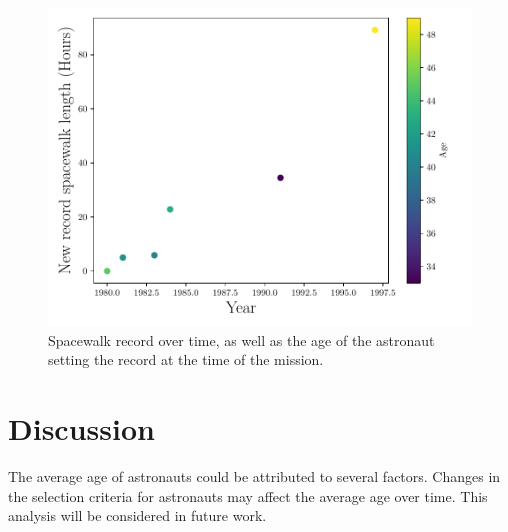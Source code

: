 \documentclass{article}
\begin{document}
\begin{figure}[h]
\centering
\includegraphics[width=\textwidth]{../analysis/spacewalk_record.pdf}
\caption{Spacewalk record over time, as well as the age of the astronaut setting the record at the time of the mission.}
\label{fig:spacewalkrecord}
\end{figure}

\section{Discussion}
The average age of astronauts could be attributed to several factors. 
Changes in the selection criteria for astronauts may affect the average age over time. 
This analysis will be considered in future work.



\end{document}
